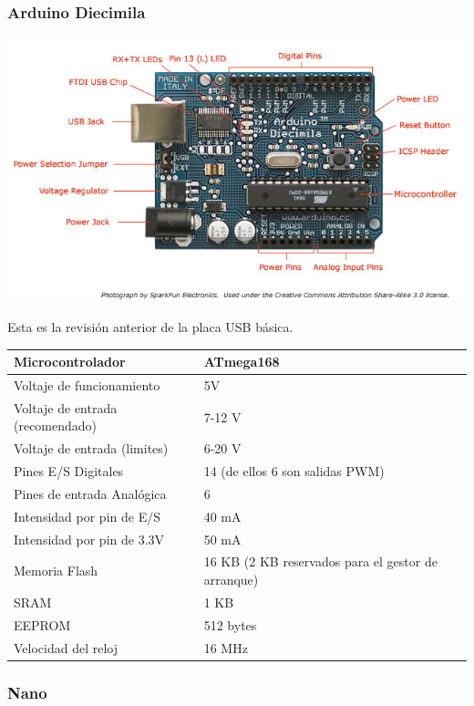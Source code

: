 \documentclass[12pt,a4paper]{report}
\begin{document}
\subsubsection{Arduino Diecimila}

\includegraphics[scale=0.6]{ArduinoDiecimilaComponents.jpg}

 Esta es la revisión anterior de la placa USB básica. 

\begin{tabular}{||l | l ||}
\hline
\hline
Microcontrolador & ATmega168\\
\hline
Voltaje de funcionamiento & 5V\\
\hline
Voltaje de entrada (recomendado) & 7-12 V\\
\hline
Voltaje de entrada (limites) & 6-20 V\\
\hline
Pines E/S Digitales & 14 (de ellos 6 son salidas PWM)\\
\hline
Pines de entrada Analógica & 6\\
\hline
Intensidad por pin de E/S & 40 mA\\
\hline
Intensidad por pin de 3.3V & 50 mA\\
\hline
Memoria Flash & 16 KB (2 KB reservados para el gestor de arranque)\\
\hline
SRAM & 1 KB\\
\hline
EEPROM & 512 bytes\\
\hline
Velocidad del reloj & 16 MHz\\
\hline
\hline
\end{tabular}

\subsubsection{Nano}
\end{document}
